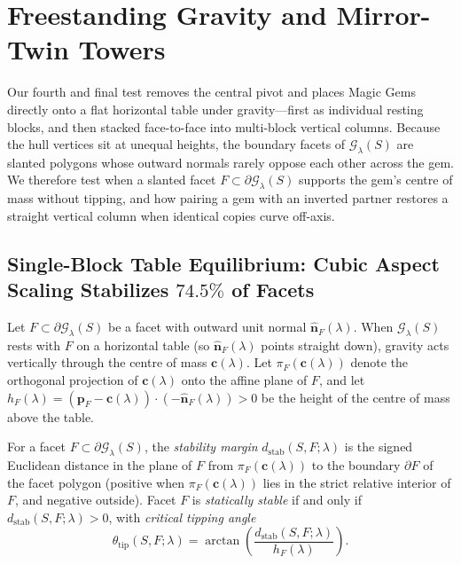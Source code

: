 \section{Freestanding Gravity and Mirror-Twin Towers}
\label{sec:stacking}

Our fourth and final test removes the central pivot and places Magic Gems directly onto a flat horizontal table under gravity—first as individual resting blocks, and then stacked face-to-face into multi-block vertical columns. Because the hull vertices sit at unequal heights, the boundary facets of $\mathcal G_\lambda(S)$ are slanted polygons whose outward normals rarely oppose each other across the gem. We therefore test when a slanted facet $F\subset\partial\mathcal G_\lambda(S)$ supports the gem's centre of mass without tipping, and how pairing a gem with an inverted partner restores a straight vertical column when identical copies curve off-axis.

\subsection{Single-Block Table Equilibrium: Cubic Aspect Scaling Stabilizes \texorpdfstring{$74.5\%$}{74.5\%} of Facets}

Let $F\subset\partial\mathcal G_\lambda(S)$ be a facet with outward unit normal $\hat{\mathbf n}_F(\lambda)$. When $\mathcal G_\lambda(S)$ rests with $F$ on a horizontal table (so $\hat{\mathbf n}_F(\lambda)$ points straight down), gravity acts vertically through the centre of mass $\mathbf c(\lambda)$. Let $\pi_F(\mathbf c(\lambda))$ denote the orthogonal projection of $\mathbf c(\lambda)$ onto the affine plane of $F$, and let $h_F(\lambda)=(\mathbf p_F-\mathbf c(\lambda))\cdot(-\hat{\mathbf n}_F(\lambda))>0$ be the height of the centre of mass above the table.

\begin{definition}
\label{def:stability}
For a facet $F\subset\partial\mathcal G_\lambda(S)$, the \emph{stability margin} $d_{\mathrm{stab}}(S,F;\lambda)$ is the signed Euclidean distance in the plane of $F$ from $\pi_F(\mathbf c(\lambda))$ to the boundary $\partial F$ of the facet polygon (positive when $\pi_F(\mathbf c(\lambda))$ lies in the strict relative interior of $F$, and negative outside). Facet $F$ is \emph{statically stable} if and only if $d_{\mathrm{stab}}(S,F;\lambda)>0$, with \emph{critical tipping angle}
\begin{equation}
\label{eq:tip-angle}
\theta_{\mathrm{tip}}(S,F;\lambda) = \arctan\!\left(\frac{d_{\mathrm{stab}}(S,F;\lambda)}{h_F(\lambda)}\right).
\end{equation}
\end{definition}

